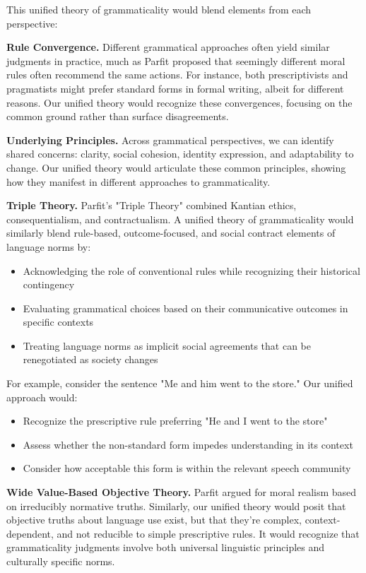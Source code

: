This unified theory of grammaticality would blend elements from each perspective:

\textbf{Rule Convergence.} Different grammatical approaches often yield similar judgments in practice, much as Parfit proposed that seemingly different moral rules often recommend the same actions. For instance, both prescriptivists and pragmatists might prefer standard forms in formal writing, albeit for different reasons. Our unified theory would recognize these convergences, focusing on the common ground rather than surface disagreements.

\textbf{Underlying Principles.} Across grammatical perspectives, we can identify shared concerns: clarity, social cohesion, identity expression, and adaptability to change. Our unified theory would articulate these common principles, showing how they manifest in different approaches to grammaticality.

\textbf{Triple Theory.} Parfit's "Triple Theory" combined Kantian ethics, consequentialism, and contractualism. A unified theory of grammaticality would similarly blend rule-based, outcome-focused, and social contract elements of language norms by:

\begin{itemize}
    \item Acknowledging the role of conventional rules while recognizing their historical contingency
    \item Evaluating grammatical choices based on their communicative outcomes in specific contexts
    \item Treating language norms as implicit social agreements that can be renegotiated as society changes
\end{itemize}

For example, consider the sentence "Me and him went to the store." Our unified approach would:

\begin{itemize}
    \item Recognize the prescriptive rule preferring "He and I went to the store"
    \item Assess whether the non-standard form impedes understanding in its context
    \item Consider how acceptable this form is within the relevant speech community
\end{itemize}

\textbf{Wide Value-Based Objective Theory.} Parfit argued for moral realism based on irreducibly normative truths. Similarly, our unified theory would posit that objective truths about language use exist, but that they're complex, context-dependent, and not reducible to simple prescriptive rules. It would recognize that grammaticality judgments involve both universal linguistic principles and culturally specific norms.


